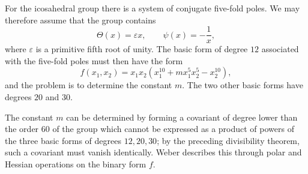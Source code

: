 \documentclass[11pt]{article}
\begin{document}
For the icosahedral group there is a system of conjugate five-fold poles.  We may therefore assume that the group contains
\begin{equation}\label{eq:w9-ico-generators}
 \Theta(x)=\varepsilon x,
 \qquad
 \psi(x)=-\frac1x,
\end{equation}
where $\varepsilon$ is a primitive fifth root of unity.  The basic form of degree $12$ associated with the five-fold poles must then have the form
\begin{equation}\label{eq:w9-ico-f}
 f(x_1,x_2)=x_1x_2(x_1^{10}+m x_1^5x_2^5-x_2^{10}),
\end{equation}
and the problem is to determine the constant $m$.  The two other basic forms have degrees $20$ and $30$.

The constant $m$ can be determined by forming a covariant of degree lower than the order $60$ of the group which cannot be expressed as a product of powers of the three basic forms of degrees $12,20,30$; by the preceding divisibility theorem, such a covariant must vanish identically.  Weber describes this through polar and Hessian operations on the binary form $f$.
\end{document}
